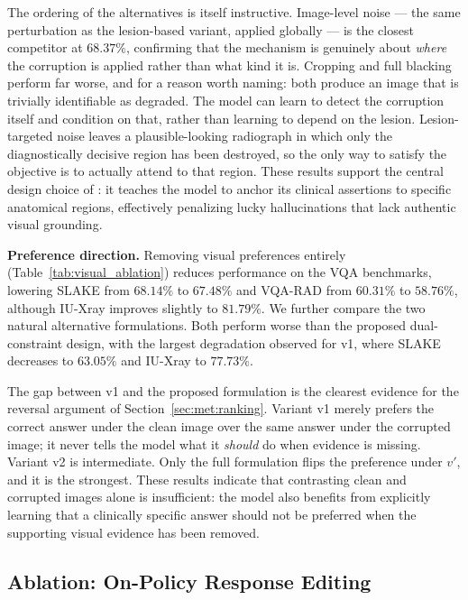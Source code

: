 The ordering of the alternatives is itself instructive. Image-level noise --- the same perturbation as the lesion-based variant, applied globally --- is the closest competitor at $68.37\%$, confirming that the mechanism is genuinely about \emph{where} the corruption is applied rather than what kind it is. Cropping and full blacking perform far worse, and for a reason worth naming: both produce an image that is trivially identifiable as degraded. The model can learn to detect the corruption itself and condition on that, rather than learning to depend on the lesion. Lesion-targeted noise leaves a plausible-looking radiograph in which only the diagnostically decisive region has been destroyed, so the only way to satisfy the objective is to actually attend to that region. These results support the central design choice of \ourloss{}: it teaches the model to anchor its clinical assertions to specific anatomical regions, effectively penalizing lucky hallucinations that lack authentic visual grounding.

\textbf{Preference direction.} Removing visual preferences entirely (Table~\ref{tab:visual_ablation}) reduces performance on the VQA benchmarks, lowering SLAKE from $68.14\%$ to $67.48\%$ and VQA-RAD from $60.31\%$ to $58.76\%$, although IU-Xray improves slightly to $81.79\%$. We further compare the two natural alternative formulations. Both perform worse than the proposed dual-constraint design, with the largest degradation observed for v1, where SLAKE decreases to $63.05\%$ and IU-Xray to $77.73\%$.

The gap between v1 and the proposed formulation is the clearest evidence for the reversal argument of Section~\ref{sec:met:ranking}. Variant v1 merely prefers the correct answer under the clean image over the same answer under the corrupted image; it never tells the model what it \emph{should} do when evidence is missing. Variant v2 is intermediate. Only the full formulation flips the preference under $v'$, and it is the strongest. These results indicate that contrasting clean and corrupted images alone is insufficient: the model also benefits from explicitly learning that a clinically specific answer should not be preferred when the supporting visual evidence has been removed.

\subsection{Ablation: On-Policy Response Editing}
\label{sec:res:abl-style}

